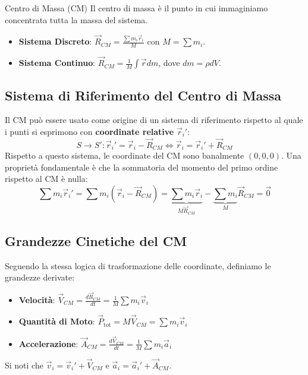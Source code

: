 \begin{definizione}{Centro di Massa (CM)}
Il centro di massa è il punto in cui immaginiamo concentrata tutta la massa del sistema.
\begin{itemize}
    \item \textbf{Sistema Discreto}: $\vec{R}_{CM} = \frac{\sum m_i \vec{r}_i}{M}$ con $M = \sum m_i$.
    \item \textbf{Sistema Continuo}: $\vec{R}_{CM} = \frac{1}{M} \int \vec{r} dm$, dove $dm = \rho dV$.
\end{itemize}
\end{definizione}

\subsection{Sistema di Riferimento del Centro di Massa}
Il CM può essere usato come origine di un sistema di riferimento rispetto al quale i punti si esprimono con \textbf{coordinate relative} $\vec{r}_i'$:
\begin{equation}
     S \to S' : \vec{r}_i' = \vec{r}_i - \vec{R}_{CM} \iff \vec{r}_i = \vec{r}_i' + \vec{R}_{CM}
\end{equation}
Rispetto a questo sistema, le coordinate del CM sono banalmente $(0,0,0)$. Una proprietà fondamentale è che la sommatoria del momento del primo ordine rispetto al CM è nulla:
\begin{equation}
    \sum m_i \vec{r}_i' = \sum m_i (\vec{r}_i - \vec{R}_{CM}) = \underbrace{\sum m_i \vec{r}_i}_{M \vec{R}_{CM}} - \underbrace{\sum m_i}_{M} \vec{R}_{CM} = \vec{0}
\end{equation}

\subsection{Grandezze Cinetiche del CM}
Seguendo la stessa logica di trasformazione delle coordinate, definiamo le grandezze derivate:
\begin{itemize}
    \item \textbf{Velocità}: $\vec{V}_{CM} = \frac{d\vec{R}_{CM}}{dt} = \frac{1}{M} \sum m_i \vec{v}_i$
    \item \textbf{Quantità di Moto}: $\vec{P}_{\text{tot}} = M \vec{V}_{CM} = \sum m_i \vec{v}_i$
    \item \textbf{Accelerazione}: $\vec{A}_{CM} = \frac{d\vec{V}_{CM}}{dt} = \frac{1}{M} \sum m_i \vec{a}_i$
\end{itemize}
Si noti che $\vec{v}_i = \vec{v}_i' + \vec{V}_{CM}$ e $\vec{a}_i = \vec{a}_i' + \vec{A}_{CM}$.

